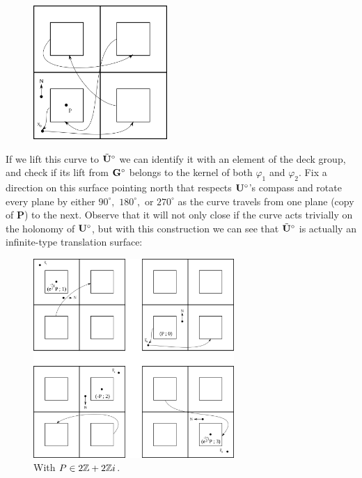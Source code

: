 \documentclass[]{article}
\def\btUs{\btU^\circ}
\begin{document}
\begin{figure}[H]
\centering
\includegraphics[width=2in]{overlay.png}
\end{figure}

\noindent If we lift this curve to $\btUs$ we can identify it with an element of the deck group, and check if its lift from $\mathbf{G}^\circ$ belongs to the kernel of both $\varphi_1$ and $\varphi_2$. Fix a direction on this surface pointing north that respects $\mathbf{U}^\circ$'s compass and rotate every plane by either $90^\circ,$ $180^\circ,$ or $270^\circ$ as the curve travels from one plane (copy of $\mathbf{P}$) to the next. Observe that it will not only close if the curve acts trivially on the holonomy of $\mathbf{U}^\circ$, but with this construction we can see that $\btUs$ is actually an infinite-type translation surface:

\begin{figure}[H]
\centering
\includegraphics[width=3in]{coverdirection.png}
\caption{With $P\in 2\mathbb{Z}+2\mathbb{Z} i$.}
\end{figure}

\noindent 
\end{document}
